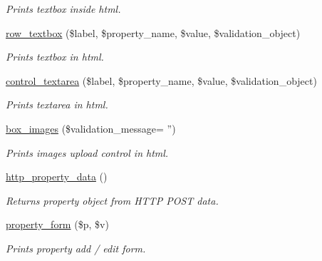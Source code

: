\begin{DoxyCompactItemize}
\begin{DoxyCompactList}\small\item\em Prints textbox inside html. \end{DoxyCompactList}\item 
\hyperlink{property__parts_8php_aa28f91331c1f0c72ca017c384cd3f0e5}{row\_\-textbox} (\$label, \$property\_\-name, \$value, \$validation\_\-object)
\begin{DoxyCompactList}\small\item\em Prints textbox in html. \end{DoxyCompactList}\item 
\hyperlink{property__parts_8php_a15fccfbc50eb7f3d3433c1411b1e273e}{control\_\-textarea} (\$label, \$property\_\-name, \$value, \$validation\_\-object)
\begin{DoxyCompactList}\small\item\em Prints textarea in html. \end{DoxyCompactList}\item 
\hyperlink{property__parts_8php_aca9f1318d86ccdadee8fd1a867396b00}{box\_\-images} (\$validation\_\-message= '')
\begin{DoxyCompactList}\small\item\em Prints images upload control in html. \end{DoxyCompactList}\item 
\hyperlink{property__parts_8php_a1402429f319a83589d7a72d4feddf4e1}{http\_\-property\_\-data} ()
\begin{DoxyCompactList}\small\item\em Returns property object from HTTP POST data. \end{DoxyCompactList}\item 
\hyperlink{property__parts_8php_a88cf9bb7bd8e7c8251f4f7462571bc9d}{property\_\-form} (\$p, \$v)
\begin{DoxyCompactList}\small\item\em Prints property add / edit form. \end{DoxyCompactList}\end{DoxyCompactItemize}
